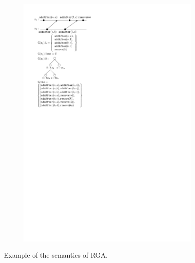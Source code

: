\begin{figure}[t]
\begin{subfigure}[!ht]{.3\linewidth}
    \includegraphics[scale=.7]{figures/LinRGA-3}
    \caption{}
    \label{fig:rga-sem-3}
  \end{subfigure}
  \caption{Example of the semantics of RGA.}
  \label{fig:rga-sem}
\end{figure}

